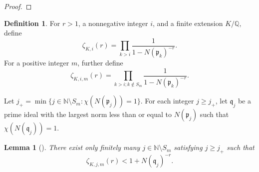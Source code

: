 \documentclass[12pt]{amsart}
\newtheorem{lemma}[theorem]{Lemma}
\theoremstyle{definition}
\newtheorem{definition}[theorem]{Definition}
\numberwithin{equation}{section}
\newcommand{\p}{\mathfrak{p}}
\newcommand{\Q}{\mathbb{Q}}
\newcommand{\N}{\mathbb{N}}
\begin{document}
\begin{proof}

\end{proof}

\begin{definition}
    For $r > 1$, a nonnegative integer $i$, and a finite extension $K/\Q,$ define $$\zeta_{K,i}(r) = \prod_{k > i} \frac{1}{1-N(\p_k)^{-r}}.$$ For a positive integer $m$, further define $$\zeta_{K,i,m} (r) = \prod_{k>i; k\not\in S_m} \frac{1}{1-N(\p_k)^{-r}}.$$
\end{definition} 

Let $j_+ = \min\{j \in \mathbb N \setminus S_m : \chi(N(\mathfrak p_j)) = 1\}.$ 
For each integer $j \geq j_+$, let $\mathfrak{q}_j$ be a prime ideal with the largest norm less than or equal to $N(\mathfrak{p}_j)$ such that $\chi(N(\mathfrak{q}_j)) = 1.$  

\begin{lemma} [{\cite[Lemma 2.2]{S17}}] \label{finiteness-finitely-many-j}
    There exist only finitely many $j \in \N \setminus S_m$ satisfying $j \geq j_+$ such that $$\zeta_{K,j,m}(r) < 1 + N(\mathfrak{q}_j)^{-r}.$$
\end{lemma}
\end{document}
